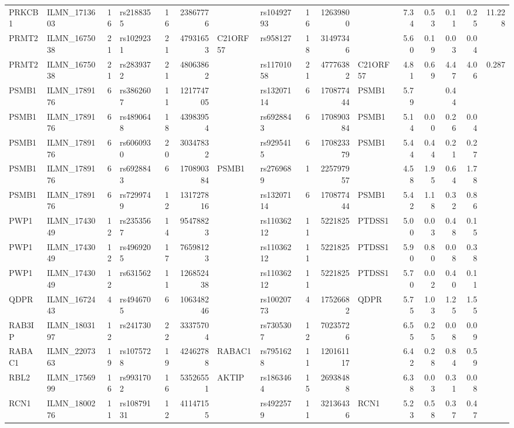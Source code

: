 \documentclass{article}
\begin{document}
\begin{landscape}
{\begin{ThreePartTable}
\begin{longtable}{|llr|lrrl|lrrl|rrrr|r|}
  PRKCB1 & ILMN\_1713603 & 16 & rs2188355 & 16 & 23867776 &  & rs10492793 & 16 & 12639800 &  & 7.34 & 0.53 & 0.11 & 0.25 & 11.228 \\
  PRMT2 & ILMN\_1675038 & 21 & rs1029231 & 21 & 47931653 & C21ORF57 & rs958127 & 18 & 31497346 &  & 5.60 & 0.19 & 0.03 & 0.04 &  \\
  PRMT2 & ILMN\_1675038 & 21 & rs2839372 & 21 & 48063862 &  & rs11701058 & 21 & 47776382 & C21ORF57 & 4.81 & 0.69 & 4.47 & 4.06 & 0.287 \\
  PSMB1 & ILMN\_1789176 & 6 & rs3862607 & 11 & 121774705 &  & rs13207114 & 6 & 170877444 & PSMB1 & 5.79 &  & 0.44 &  &  \\
  PSMB1 & ILMN\_1789176 & 6 & rs4890648 & 18 & 43983954 &  & rs6928843 & 6 & 170890384 & PSMB1 & 5.14 & 0.00 & 0.26 & 0.04 &  \\
  PSMB1 & ILMN\_1789176 & 6 & rs6060930 & 20 & 30347832 &  & rs9295415 & 6 & 170823379 & PSMB1 & 5.44 & 0.44 & 0.21 & 0.27 &  \\
  PSMB1 & ILMN\_1789176 & 6 & rs6928843 & 6 & 170890384 & PSMB1 & rs2769689 & 1 & 225797957 &  & 4.58 & 1.95 & 0.64 & 1.78 &  \\
  PSMB1 & ILMN\_1789176 & 6 & rs7299749 & 12 & 131727816 &  & rs13207114 & 6 & 170877444 & PSMB1 & 5.42 & 1.18 & 0.32 & 0.86 &  \\
  PWP1 & ILMN\_1743049 & 12 & rs2353567 & 14 & 95478823 &  & rs11036212 & 11 & 5221825 & PTDSS1 & 5.00 & 0.03 & 0.48 & 0.15 &  \\
  PWP1 & ILMN\_1743049 & 12 & rs4969205 & 17 & 76598123 &  & rs11036212 & 11 & 5221825 & PTDSS1 & 5.90 & 0.80 & 0.08 & 0.38 &  \\
  PWP1 & ILMN\_1743049 & 12 & rs631562 & 11 & 126852438 &  & rs11036212 & 11 & 5221825 & PTDSS1 & 5.70 & 0.02 & 0.40 & 0.11 &  \\
  QDPR & ILMN\_1672443 & 4 & rs4946705 & 6 & 106348246 &  & rs10020773 & 4 & 17526682 & QDPR & 5.75 & 1.03 & 1.25 & 1.55 &  \\
  RAB3IP & ILMN\_1803197 & 12 & rs241730 & 22 & 33375704 &  & rs7305307 & 12 & 70235726 &  & 6.55 & 0.25 & 0.08 & 0.09 &  \\
  RABAC1 & ILMN\_2207363 & 19 & rs1075728 & 19 & 42462788 & RABAC1 & rs7951628 & 11 & 120161117 &  & 6.42 & 0.28 & 0.84 & 0.59 &  \\
  RBL2 & ILMN\_1756999 & 16 & rs9931702 & 16 & 53526551 & AKTIP & rs1863464 & 15 & 26938488 &  & 6.38 & 0.03 & 0.31 & 0.08 &  \\
  RCN1 & ILMN\_1800276 & 11 & rs10879131 & 12 & 41147155 &  & rs4922579 & 11 & 32136436 & RCN1 & 5.23 & 0.58 & 0.37 & 0.47 &  \\

\end{longtable}
\end{ThreePartTable}}
\end{landscape}
\end{document}
